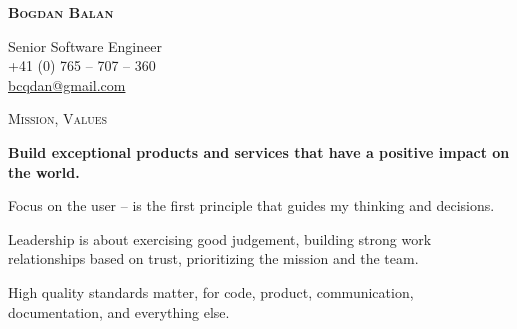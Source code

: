 \documentclass[10pt]{article}
\begin{document}
\noindent
\textcolor{Primary}{\textbf {\huge {\textsc{Bogdan Balan}}}}

\vspace{0.16in}
\noindent
Senior Software Engineer \\
+41 (0) 765 -- 707 -- 360\\
\href{mailto:bcqdan@gmail.com}{bcqdan@gmail.com}

\vspace{0.32in}
\noindent
\textcolor{Primary}{{\large \textsc{Mission, Values}}}

\begin{list}{}{\leftmargin=0em}
  \setlength{\itemsep}{1pt}
  \setlength{\parskip}{0pt}
  \setlength{\parsep}{0pt}

\item
{\bf Build exceptional products and services that have a positive impact on the world.}
\item
Focus on the user -- is the first principle that guides my thinking and decisions.
\item
Leadership is about exercising good judgement, building strong work relationships based on trust, prioritizing the mission and the team.
\item
High quality standards matter, for code, product, communication, documentation, and everything else.

\end{list}
\end{document}
